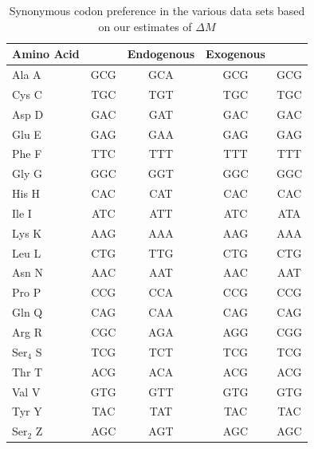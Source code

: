 \documentclass[fleqn,letterpaper]{article}
\begin{document}
\begin{table}[h]
    \centering
    \caption{Synonymous codon preference in the various data sets based on our estimates of $\Delta M$}
\begin{tabular}{  l  c  c  c  c  }
\hline
	Amino Acid & \gossypii & Endogenous & Exogenous & \kluyveri \\ \hline
	Ala A & GCG & GCA & GCG & GCG \\ 
	Cys C & TGC & TGT & TGC & TGC \\ 
	Asp D & GAC & GAT & GAC & GAC \\ 
	Glu E & GAG & GAA & GAG & GAG \\ 
	Phe F & TTC & TTT & TTT & TTT \\ 
	Gly G & GGC & GGT & GGC & GGC \\ 
	His H & CAC & CAT & CAC & CAC \\ 
	Ile I & ATC & ATT & ATC & ATA \\ 
	Lys K & AAG & AAA & AAG & AAA \\ 
	Leu L & CTG & TTG & CTG & CTG \\ 
	Asn N & AAC & AAT & AAC & AAT \\ 
	Pro P & CCG & CCA & CCG & CCG \\ 
	Gln Q & CAG & CAA & CAG & CAG \\ 
	Arg R & CGC & AGA & AGG & CGG \\ 
	Ser$_4$ S & TCG & TCT & TCG & TCG \\
	Thr T & ACG & ACA & ACG & ACG \\ 
	Val V & GTG & GTT & GTG & GTG \\ 
	Tyr Y & TAC & TAT & TAC & TAC \\ 
	Ser$_2$ Z & AGC & AGT & AGC & AGC \\ \hline
\end{tabular}
    \label{tab:codon_pref_dm}
\end{table}

\clearpage
\end{document}
